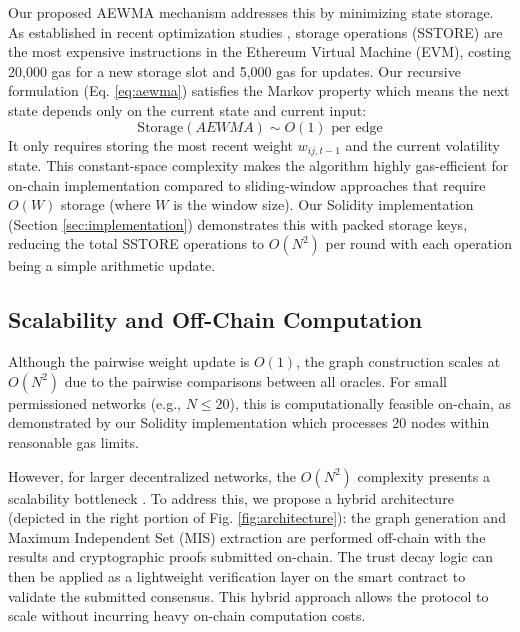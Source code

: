 \documentclass{ieeeaccess}
\begin{document}
Our proposed AEWMA mechanism addresses this by minimizing state storage. As established in recent optimization studies \cite{b16}, storage operations (SSTORE) are the most expensive instructions in the Ethereum Virtual Machine (EVM), costing 20,000 gas for a new storage slot and 5,000 gas for updates. Our recursive formulation (Eq. \ref{eq:aewma}) satisfies the Markov property which means the next state depends only on the current state and current input:
\begin{equation}
\text{Storage}(AEWMA) \sim O(1) \text{ per edge}
\end{equation}
It only requires storing the most recent weight $w_{ij,t-1}$ and the current volatility state. This constant-space complexity makes the algorithm highly gas-efficient for on-chain implementation compared to sliding-window approaches that require $O(W)$ storage (where $W$ is the window size). Our Solidity implementation (Section \ref{sec:implementation}) demonstrates this with packed storage keys, reducing the total SSTORE operations to $O(N^2)$ per round with each operation being a simple arithmetic update.

\subsection{Scalability and Off-Chain Computation}
Although the pairwise weight update is $O(1)$, the graph construction scales at $O(N^2)$ due to the pairwise comparisons between all oracles. For small permissioned networks (e.g., $N \le 20$), this is computationally feasible on-chain, as demonstrated by our Solidity implementation which processes 20 nodes within reasonable gas limits.

However, for larger decentralized networks, the $O(N^2)$ complexity presents a scalability bottleneck \cite{b17}. To address this, we propose a hybrid architecture (depicted in the right portion of Fig. \ref{fig:architecture}): the graph generation and Maximum Independent Set (MIS) extraction are performed off-chain with the results and cryptographic proofs submitted on-chain. The trust decay logic can then be applied as a lightweight verification layer on the smart contract to validate the submitted consensus. This hybrid approach allows the protocol to scale without incurring heavy on-chain computation costs.
\end{document}
